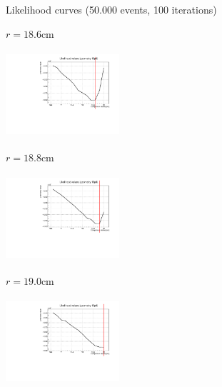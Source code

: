 \documentclass[8 pt]{beamer}
\begin{document}
\begin{frame}{Likelihood curves (50.000 events, 100 iterations)}
\vspace{-5pt}
\begin{minipage}[c]{.32\textwidth}
\begin{exampleblock}{} \begin{center}$r = 18.6$cm\end{center} \end{exampleblock}
\includegraphics[width=4.2cm, height=3.2cm]{figs/likelihood100HighStat/likelihood18p6.pdf} 
\end{minipage}
\begin{minipage}[c]{.32\textwidth}
\begin{exampleblock}{} \begin{center}$r = 18.8$cm\end{center} \end{exampleblock}
\includegraphics[width=4.2cm, height=3.2cm]{figs/likelihood100HighStat/likelihood18p8.pdf} 
\end{minipage}
\begin{minipage}[c]{.32\textwidth}
\begin{exampleblock}{} \begin{center}$r = 19.0$cm\end{center} \end{exampleblock}
\includegraphics[width=4.2cm, height=3.2cm]{figs/likelihood100HighStat/likelihood19p0.pdf} 
\end{minipage}
\end{frame}
\end{document}
